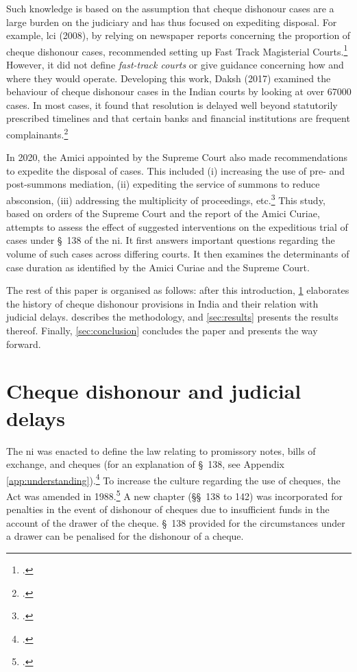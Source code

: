 Such knowledge is based on the assumption that cheque dishonour cases are a large burden on the judiciary and has thus focused on expediting disposal. For example, \gls{lci} (2008), by relying on newspaper reports concerning the proportion of cheque dishonour cases, recommended setting up Fast Track Magisterial Courts.\footcite{lci2008_138, bhan2015_placing} However, it did not define \textit{fast-track courts} or give guidance concerning how and where they would operate. Developing this work, Daksh (2017) examined the behaviour of cheque dishonour cases in the Indian courts by looking at over 67000 cases. In most cases, it found that resolution is delayed well beyond statutorily prescribed timelines and that certain banks and financial institutions are frequent complainants.\footcite{sridhar2017_cheque}

In 2020, the Amici appointed by the Supreme Court also made recommendations to expedite the disposal of cases. This included (i) increasing the use of pre- and post-summons mediation, (ii) expediting the service of summons to reduce absconsion, (iii) addressing the multiplicity of proceedings, etc.\footcite{amicus2020_submission} This study, based on orders of the Supreme Court and the report of the Amici Curiae, attempts to assess the effect of suggested interventions on the expeditious trial of cases under \S~138 of the \gls{ni}. It first answers important questions regarding the volume of such cases across differing courts. It then examines the determinants of case duration as identified by the Amici Curiae and the Supreme Court.

The rest of this paper is organised as follows: after this introduction, \cref{sec:history} elaborates the history of cheque dishonour provisions in India and their relation with judicial delays.  describes the methodology, and \cref{sec:results} presents the results thereof. Finally, \cref{sec:conclusion} concludes the paper and presents the way forward.

\section{Cheque dishonour and judicial delays} \label{sec:history}

The \acrlong{ni} was enacted to define the law relating to promissory notes, bills of exchange, and cheques (for an explanation of \S~138, see Appendix \ref{app:understanding}).\footcite{ind1881_niAct} To increase the culture regarding the use of cheques, the Act was amended in 1988.\footcite{niAmend1988} A new chapter (\S\S~138 to 142) was incorporated for penalties in the event of dishonour of cheques due to insufficient funds in the account of the drawer of the cheque. \S~138 provided for the circumstances under a drawer can be penalised for the dishonour of a cheque.


